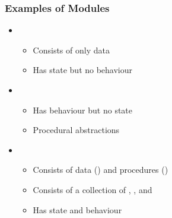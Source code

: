 \documentclass[t,12pt,numbers,fleqn,handout]{beamer}
\begin{document}
\begin{frame}
\frametitle{Examples of Modules \cite{GhezziEtAl2003}}

\begin{itemize}

\item {}
\begin{itemize}
\item Consists of only data
\item Has state but no behaviour
\end{itemize}
\item {}
\begin{itemize}
\item Has behaviour but no state
\item Procedural abstractions
\end{itemize}
\item {}
\begin{itemize}
\item Consists of data () and procedures ()
\item Consists of a collection of ,
  , and 
\item Has state and behaviour
\end{itemize}
\end{itemize}

\end{frame}

\end{document}

